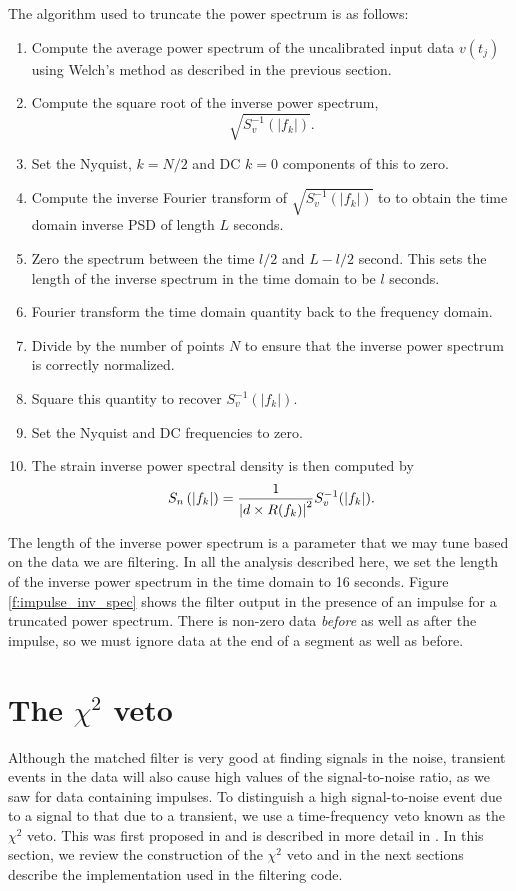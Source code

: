 The algorithm used to truncate the power spectrum is as follows:
\begin{enumerate}
\item Compute the average power spectrum of the uncalibrated input data
$v(t_j)$ using Welch's method as described in the previous section.
\item Compute the square root of the inverse power spectrum,
\begin{equation}
\sqrt{S^{-1}_v(|f_k|)}.
\end{equation}
\item Set the Nyquist, $k = N/2$ and DC $k = 0$ components of this to zero.
\item Compute the inverse Fourier transform of $\sqrt{S^{-1}_v(|f_k|)}$ to to
obtain the time domain inverse PSD of length $L$ seconds.
\item Zero the spectrum between the time $l/2$ and $L-l/2$ second. This sets
the length of the inverse spectrum in the time domain to be $l$ seconds.
\item Fourier transform the time domain quantity back to the frequency domain.
\item Divide by the number of points $N$ to ensure that the inverse power
spectrum is correctly normalized.
\item Square this quantity to recover $S^{-1}_v(|f_k|)$.
\item Set the Nyquist and DC frequencies to zero.
\item The strain inverse power spectral density is then computed by
\begin{equation}
S_n\left(\left|f_{k}\right|\right) = \frac{1}{\left|d \times R(f_k)\right|^2} S^{-1}_v(|f_k|).
\end{equation}
\end{enumerate}
The length of the inverse power spectrum is a parameter that we may tune based
on the data we are filtering. In all the analysis described here, we set the
length of the inverse power spectrum in the time domain to 16 seconds.
Figure \ref{f:impulse_inv_spec} shows the filter output in the presence of an
impulse for a truncated power spectrum. There is non-zero data \emph{before}
as well as after the impulse, so we must ignore data at the end of a segment
as well as before.

\section{The $\chi^2$ veto}
\label{s:chisqcts}

Although the matched filter is very good at finding signals in the noise,
transient events in the data will also cause high values of the
signal-to-noise ratio, as we saw for data containing impulses. To distinguish
a high signal-to-noise event due to a signal to that due to a transient, we
use a time-frequency veto known as the $\chi^2$ veto. This was first proposed
in \cite{grasp} and is described in more detail in \cite{Allen:2004}.
In this section, we review the construction of the $\chi^2$ veto and in the
next sections describe the implementation used in the filtering code.

